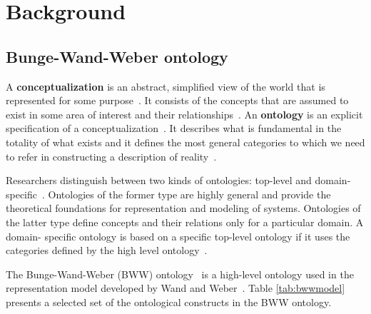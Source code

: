 \chapter{Background}
\label{sec:background}

\section{Bunge-Wand-Weber ontology}

A \textbf{conceptualization} is an abstract, simplified view of the world that is represented for
some purpose~\cite{gruber1995toward}. It consists of the concepts that are assumed to exist in some
area of interest and their relationships~\cite{gruber1995toward}. An \textbf{ontology} is an
explicit specification of a conceptualization~\cite{gruber1995toward}. It describes what is
fundamental in the totality of what exists and it defines the most general categories to which we
need to refer in constructing a description of reality~\cite{milton2004top}.

Researchers distinguish between two kinds of ontologies: top-level and domain-
specific~\cite{milton2004top}. Ontologies of the former type are highly general and provide the
theoretical foundations for representation and modeling of systems. Ontologies of the latter type
define concepts and their relations only for a particular domain. A domain- specific ontology is
based on a specific top-level ontology if it uses the categories defined by the high level
ontology~\cite{milton2004top}.

The Bunge-Wand-Weber (BWW) ontology~\cite{wand1990ontological} is a high-level ontology used in the
representation model developed by Wand and Weber~\cite{wand1995deep}. Table \ref{tab:bwwmodel}
presents a selected set of the ontological constructs in the BWW ontology.

